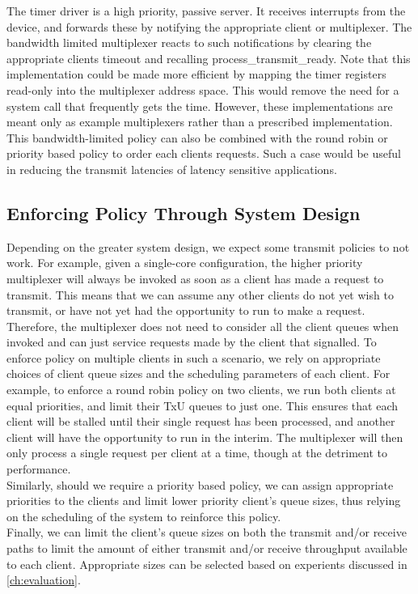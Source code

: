 The timer driver is a high priority, passive server. It receives interrupts from the device,
and forwards these by notifying the appropriate client or multiplexer. The bandwidth limited
multiplexer reacts to such notifications by clearing the appropriate clients timeout and
recalling process\_transmit\_ready. Note that this implementation could be made more efficient
by mapping the timer registers read-only into the multiplexer address space. This would remove
the need for a system call that frequently gets the time. However, these implementations are 
meant only as example multiplexers rather than a prescribed implementation. \\

This bandwidth-limited policy can also be combined with the round robin or priority based policy
to order each clients requests. Such a case would be useful in reducing the 
transmit latencies of latency sensitive applications.\\ 


\subsection{Enforcing Policy Through System Design}
Depending on the greater system design, we expect some transmit policies to not work.
For example, given a single-core configuration, the higher priority multiplexer will
always be invoked as soon as a client has made a request to transmit. This means that
we can assume any other clients do not yet wish to transmit, or have not yet had the
opportunity to run to make a request. Therefore, the multiplexer does not need to 
consider all the client queues when invoked and can just service requests made
by the client that signalled. To enforce policy on multiple clients in such a scenario,
we rely on appropriate choices of client queue sizes and the scheduling parameters
of each client. For example, to enforce a round robin policy on two clients, we run both clients
at equal priorities, and limit their TxU queues to just one. This ensures
that each client will be stalled until their single request has been processed, and
another client will have the opportunity to run in the interim. The multiplexer will
then only process a single request per client at a time, though at the detriment to performance.\\
Similarly, should we require a priority based policy, we can assign appropriate priorities
to the clients and limit lower priority client's queue sizes, thus relying on the scheduling
of the system to reinforce this policy.\\
Finally, we can limit the client's queue sizes on both the transmit and/or receive paths
to limit the amount of either transmit and/or receive throughput available to each client.
Appropriate sizes can be selected based on experients discussed in \autoref{ch:evaluation}.\\ 

